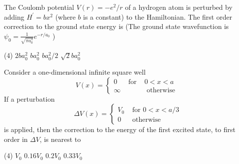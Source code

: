 \begin{enumerate}
\begin{minipage}{\textwidth}
	\item The Coulomb potential $V(r)=-e^{2} / r$ of a hydrogen atom is perturbed by adding $H^{\prime}=b x^{2}$ (where $b$ is a constant) to the Hamiltonian. The first order correction to the ground state energy is
	(The ground state wavefunction is $\psi_{0}=\frac{1}{\sqrt{\pi a_{0}^{3}}} e^{-r / a_{0}}$ )
\end{minipage}
\begin{tasks}(4)
	\task[\textbf{A.}] $2 b a_{0}^{2}$
	\task[\textbf{B.}]$b a_{0}^{2}$
	\task[\textbf{C.}]$b a_{0}^{2} / 2$
	\task[\textbf{D.}]$\sqrt{2} b a_{0}^{2}$
\end{tasks}
\begin{minipage}{\textwidth}
	\item Consider a one-dimensional infinite square well
	$$
	V(x)=\left\{\begin{array}{lll}
	0 & \text { for } & 0<x<a \\
	\infty & & \text { otherwise }
	\end{array}\right.
	$$
	If a perturbation
	$$
	\Delta V(x)=\left\{\begin{array}{lc}
	V_{0} & \text { for } 0<x<a / 3 \\
	0 & \text { otherwise }
	\end{array}\right.
	$$
	is applied, then the correction to the energy of the first excited state, to first order in $\Delta V$, is nearest to
\end{minipage}
\begin{tasks}(4)
	\task[\textbf{A.}] $V_{0}$
	\task[\textbf{B.}]$0.16 V_{0}$
	\task[\textbf{C.}]$0.2 V_{0}$
	\task[\textbf{D.}]$0.33 V_{0}$
\end{tasks}
 \end{enumerate}
 
